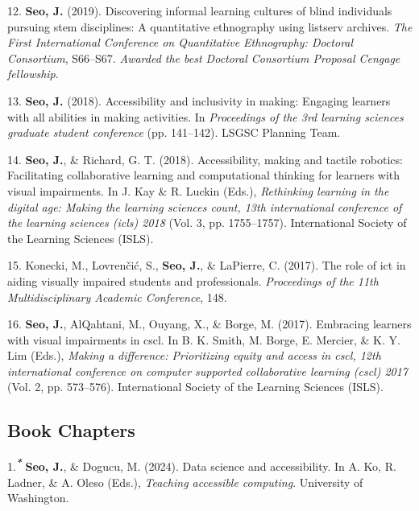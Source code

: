 \documentclass[11pt,a4paper,]{awesome-cv}
\begin{document}
\leavevmode\hypertarget{ref-seo2019discovering}{}%
12. \textbf{Seo, J.} (2019). Discovering informal learning cultures of
blind individuals pursuing stem disciplines: A quantitative ethnography
using listserv archives. \emph{The First International Conference on
Quantitative Ethnography: Doctoral Consortium}, S66--S67. \emph{Awarded
the best Doctoral Consortium Proposal Cengage fellowship}.

\leavevmode\hypertarget{ref-seo2018making}{}%
13. \textbf{Seo, J.} (2018). Accessibility and inclusivity in making:
Engaging learners with all abilities in making activities. In
\emph{Proceedings of the 3rd learning sciences graduate student
conference} (pp. 141--142). LSGSC Planning Team.

\leavevmode\hypertarget{ref-seo2018accessibility}{}%
14. \textbf{Seo, J.}, \& Richard, G. T. (2018). Accessibility, making
and tactile robotics: Facilitating collaborative learning and
computational thinking for learners with visual impairments. In J. Kay
\& R. Luckin (Eds.), \emph{Rethinking learning in the digital age:
Making the learning sciences count, 13th international conference of the
learning sciences (icls) 2018} (Vol. 3, pp. 1755--1757). International
Society of the Learning Sciences (ISLS).

\leavevmode\hypertarget{ref-konecki2017role}{}%
15. Konecki, M., Lovrenčić, S., \textbf{Seo, J.}, \& LaPierre, C.
(2017). The role of ict in aiding visually impaired students and
professionals. \emph{Proceedings of the 11th Multidisciplinary Academic
Conference}, 148.

\leavevmode\hypertarget{ref-seo2017embracing}{}%
16. \textbf{Seo, J.}, AlQahtani, M., Ouyang, X., \& Borge, M. (2017).
Embracing learners with visual impairments in cscl. In B. K. Smith, M.
Borge, E. Mercier, \& K. Y. Lim (Eds.), \emph{Making a difference:
Prioritizing equity and access in cscl, 12th international conference on
computer supported collaborative learning (cscl) 2017} (Vol. 2, pp.
573--576). International Society of the Learning Sciences (ISLS).

\hypertarget{book-chapters}{%
\subsection{Book Chapters}\label{book-chapters}}

\hypertarget{bibliography}{}
\leavevmode\hypertarget{ref-SeoDogucu2023}{}%
1.\textsuperscript{\emph{\textbf{*}}} \textbf{Seo, J.}, \& Dogucu, M.
(2024). Data science and accessibility. In A. Ko, R. Ladner, \& A. Oleso
(Eds.), \emph{Teaching accessible computing}. University of Washington.
\end{document}
